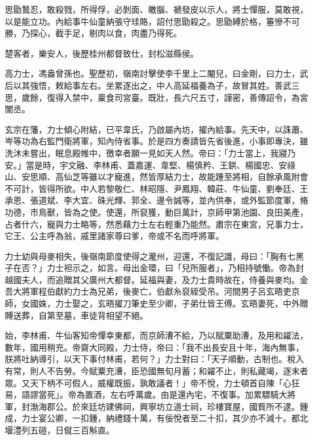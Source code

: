 \begin{pinyinscope}
 思勖鷙忍，敢殺戮，所得俘，必剝面、皦腦、褫發皮以示人，將士憚服，莫敢視，以是能立功。內給事牛仙童納張守珪賂，詔付思勖殺之。思勖縛於格，箠慘不可勝，乃探心，截手足，剔肉以食，肉盡乃得死。



 楚客者，樂安人，後歷桂州都督致仕，封松滋縣侯。



 高力士，馮盎曾孫也。聖歷初，嶺南討擊使李千里上二閹兒，曰金剛，曰力士，武后以其強悟，敕給事左右。坐累逐出之，中人高延福養為子，故冒其姓。善武三思，歲餘，復得入禁中，稟食司宮臺。既壯，長六尺五寸，謹密，善傳詔令，為宮闈丞。



 玄宗在籓，力士傾心附結，已平韋氏，乃啟屬內坊，擢內給事。先天中，以誅蕭、岑等功為右監門衛將軍，知內侍省事。於是四方奏請皆先省後進，小事即專決，雖洗沐未嘗出，眠息殿帷中，徼幸者願一見如天人然。帝曰：「力士當上，我寢乃安。」當是時，宇文融、李林甫、蓋嘉運、韋堅、楊慎矜、王鉷、楊國忠、安祿山、安思順、高仙芝等雖以才寵進，然皆厚結力士，故能踵至將相，自餘承風附會不可計，皆得所欲。中人若黎敬仁、林昭隱、尹鳳翔、韓莊、牛仙童、劉奉廷、王承恩、張道斌、李大宜、硃光輝、郭全、邊令誠等，並內供奉，或外監節度軍，脩功德，市鳥獸，皆為之使。使還，所裒獲，動巨萬計，京師甲第池園、良田美產，占者什六，寵與力士略等，然悉藉力士左右輕重乃能然。肅宗在東宮，兄事力士，它王、公主呼為翁，戚里諸家尊曰爹，帝或不名而呼將軍。



 力士幼與母麥相失，後嶺南節度使得之瀧州，迎還，不復記識，母曰：「胸有七黑子在否？」力士袒示之，如言。母出金環，曰「兒所服者」，乃相持號慟。帝為封越國夫人，而追贈其父廣州大都督。延福與妻，及力士貴時故在，侍養與麥均。金吾大將軍程伯獻約力士為兄弟，後麥亡，伯獻糸裒絰受吊。河間男子呂玄晤吏京師，女國姝，力士娶之，玄晤擢刀筆史至少卿，子弟仕皆王傅。玄晤妻死，中外贈賻送葬，自第至墓，車徒背相望不絕。



 始，李林甫、牛仙客知帝憚幸東都，而京師漕不給，乃以賦粟助漕，及用和糴法，數年，國用稍充。帝齋大同殿，力士侍，帝曰：「我不出長安且十年，海內無事，朕將吐納導引，以天下事付林甫，若何？」力士對曰：「天子順動，古制也。稅入有常，則人不告勞。今賦粟充漕，臣恐國無旬月蓄；和糴不止，則私藏竭，逐末者眾。又天下柄不可假人，威權既振，孰敢議者！」帝不悅，力士頓首自陳「心狂易，語謬當死」。帝為置酒，左右呼萬歲。由是還內宅，不復事。加累驃騎大將軍，封渤海郡公。於來廷坊建佛祠，興寧坊立道士祠，珍樓寶屋，國貲所不逮。鍾成，力士宴公卿，一扣鍾，納禮錢十萬，有佞悅者至二十扣，其少亦不減十。都北堰澧列五磑，日僦三百斛直。




\end{pinyinscope}
